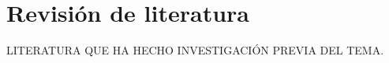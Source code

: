 \chapter{Revisión de literatura}

\noindent LITERATURA QUE HA HECHO INVESTIGACIÓN PREVIA DEL TEMA.  

\newpage

